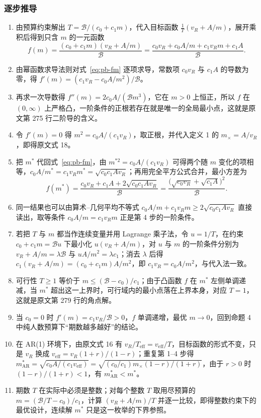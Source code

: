 \subsubsection{逐步推导}

\begin{enumerate}
\item 由预算约束解出 $T=\mathcal B/(c_0+c_1m)$，代入目标函数 $\frac1T(v_R+A/m)$，展开乘积后得到只含 $m$ 的一元函数
\begin{equation}
f(m)=\frac{(c_0+c_1m)(v_R+A/m)}{\mathcal B}=\frac{c_0v_R+c_0A/m+c_1v_Rm+c_1A}{\mathcal B}.\label{eq:pb-fm}
\end{equation}
\item 由幂函数求导法则对式~\eqref{eq:pb-fm} 逐项求导，常数项 $c_0v_R$ 与 $c_1A$ 的导数为零，得 $f'(m)=(c_1v_R-c_0A/m^2)/\mathcal B$。
\item 再求一次导数得 $f''(m)=2c_0A/(\mathcal Bm^3)$，它在 $m>0$ 上恒正，所以 $f$ 在 $(0,\infty)$ 上严格凸，一阶条件的正根若存在就是唯一的全局最小点，这就是原文第 275 行二阶导的含义。
\item 令 $f'(m)=0$ 得 $m^2=c_0A/(c_1v_R)$，取正根，并代入定义 1 的 $m_\times=A/v_R$，即得原文式 18。
\item 把 $m^*$ 代回式~\eqref{eq:pb-fm}，由 $m^{*2}=c_0A/(c_1v_R)$ 可得两个随 $m$ 变化的项相等，$c_0A/m^*=c_1v_Rm^*=\sqrt{c_0c_1Av_R}$；再用完全平方公式合并，最小方差为
\begin{equation}
f(m^*)=\frac{c_0v_R+c_1A+2\sqrt{c_0c_1Av_R}}{\mathcal B}=\frac{\big(\sqrt{c_0v_R}+\sqrt{c_1A}\big)^2}{\mathcal B}.\label{eq:pb-fmin}
\end{equation}
\item 同一结果也可以由算术–几何平均不等式 $c_0A/m+c_1v_Rm\ge2\sqrt{c_0c_1Av_R}$ 直接读出，取等条件 $c_0A/m=c_1v_Rm$ 正是第 4 步的一阶条件。
\item 若把 $T$ 与 $m$ 都当作连续变量并用 Lagrange 乘子法，令 $u=1/T$，在约束 $c_0+c_1m=\mathcal Bu$ 下最小化 $u(v_R+A/m)$，对 $u$ 与 $m$ 的一阶条件分别为 $v_R+A/m=\lambda\mathcal B$ 与 $uA/m^2=\lambda c_1$；消去 $\lambda$ 后得 $c_1(v_R+A/m)=(c_0+c_1m)A/m^2$，即 $c_1v_R=c_0A/m^2$，与代入法一致。
\item 可行性 $T\ge1$ 等价于 $m\le(\mathcal B-c_0)/c_1$；由于凸函数 $f$ 在 $m^*$ 左侧单调递减，当 $m^*$ 超出这一上界时，可行域内的最小点落在上界本身，对应 $T=1$，这就是原文第 279 行的角点解。
\item 当 $c_0=0$ 时 $f'(m)=c_1v_R/\mathcal B>0$，$f$ 单调递增，最优 $m\to0$，回到命题 4 中纯人数预算下“期数越多越好”的结论。
\item 在 AR(1) 环境下，由原文式 16 有 $v_R/T_{\operatorname{eff}}=v_{\mathrm{eff}}/T$，目标函数的形式不变，只是 $v_R$ 换成 $v_{\mathrm{eff}}=v_R(1+r)/(1-r)$；重复第 1–4 步得 $m^*_{\mathrm{AR}}=\sqrt{c_0A/(c_1v_{\mathrm{eff}})}=\sqrt{(c_0/c_1)m_\times(1-r)/(1+r)}$，由于 $r>0$ 时 $(1-r)/(1+r)<1$，有 $m^*_{\mathrm{AR}}<m^*$。
\item 期数 $T$ 在实际中必须是整数；对每个整数 $T$ 取用尽预算的 $m=(\mathcal B/T-c_0)/c_1$，计算 $(v_R+A/m)/T$ 并逐一比较，即得整数约束下的最优设计，连续解 $m^*$ 只是这一枚举的下界参照。
\end{enumerate}


